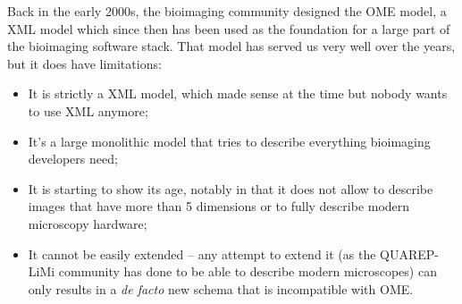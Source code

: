 \begin{frame}
{    Back in the early 2000s, the bioimaging community designed the OME
    model, a XML model which since then has been used as the foundation
    for a large part of the bioimaging software stack. That model has
    served us very well over the years, but it does have limitations:

    \begin{itemize}
      \item It is strictly a XML model, which made sense at the time but
            nobody wants to use XML anymore;
      \item It's a large monolithic model that tries to describe
            everything bioimaging developers need;
      \item It is starting to show its age, notably in that it does not
            allow to describe images that have more than 5 dimensions or
            to fully describe modern microscopy hardware;
      \item It cannot be easily extended -- any attempt to extend it (as
            the QUAREP-LiMi community has done to be able to describe
            modern microscopes) can only results in a \emph{de facto}
            new schema that is incompatible with OME.
    \end{itemize}
  }
\end{frame}

